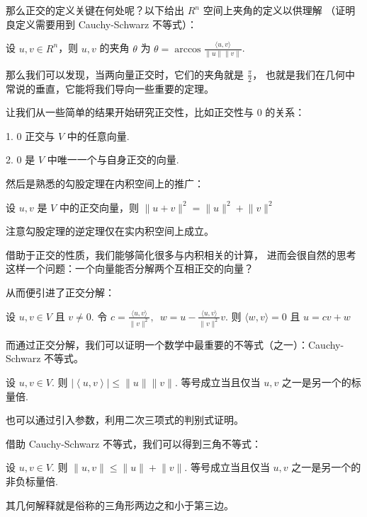 那么正交的定义关键在何处呢？以下给出 $R^{n}$ 空间上夹角的定义以供理解
（证明良定义需要用到 Cauchy-Schwarz 不等式）：
\begin{definition}
    设 $u, v \in R^{n}$，则 $u, v$ 的夹角 $ \theta $ 为 
    $ \theta = \arccos \frac{\langle u, v\rangle}{\lVert u \rVert \lVert v \rVert}$.
\end{definition}

那么我们可以发现，当两向量正交时，它们的夹角就是 $\frac{\pi}{2}$，
也就是我们在几何中常说的垂直，它能将我们导向一些重要的定理。

\vspace{2ex} 

让我们从一些简单的结果开始研究正交性，比如正交性与 0 的关系：

1. 0 正交与 $V$ 中的任意向量.

2. 0 是 $V$ 中唯一一个与自身正交的向量.

\clearpage %

然后是熟悉的勾股定理在内积空间上的推广：
\begin{theorem}
    设 $u, v$ 是 $V$ 中的正交向量，则 $\lVert u + v \rVert^2 = \lVert u \rVert^2 + \lVert v \rVert^2 $ 
\end{theorem}

注意勾股定理的逆定理仅在实内积空间上成立。

\vspace{2ex} 

借助于正交的性质，我们能够简化很多与内积相关的计算，
进而会很自然的思考这样一个问题：一个向量能否分解两个互相正交的向量？

从而便引进了正交分解：
\begin{theorem}
    设 $u, v \in V$ 且 $v \neq 0$. 令 $ c = \frac{\langle u, v\rangle}{\lVert v \rVert^2}, 
    \enspace w = u - \frac{\langle u, v\rangle}{\lVert v \rVert^2}v$. 则 $\langle w, v\rangle = 0$ 
    且 $u = cv + w$
\end{theorem}

而通过正交分解，我们可以证明一个数学中最重要的不等式（之一）：Cauchy-Schwarz 不等式。
\begin{theorem}
    设 $u, v \in V$. 则 $\left\lvert \left\langle u, v\right\rangle \right\rvert \leqslant \lVert u \rVert\lVert v \rVert$. 
    等号成立当且仅当 $u, v$ 之一是另一个的标量倍.
\end{theorem}
也可以通过引入参数，利用二次三项式的判别式证明。

\vspace{2ex}

借助 Cauchy-Schwarz 不等式，我们可以得到三角不等式：
\begin{theorem}
    设 $u, v \in V$. 则 $\lVert u, v \rVert \leqslant \lVert u \rVert + \lVert v \rVert$.
    等号成立当且仅当 $u, v$ 之一是另一个的非负标量倍.
\end{theorem}
其几何解释就是俗称的三角形两边之和小于第三边。

